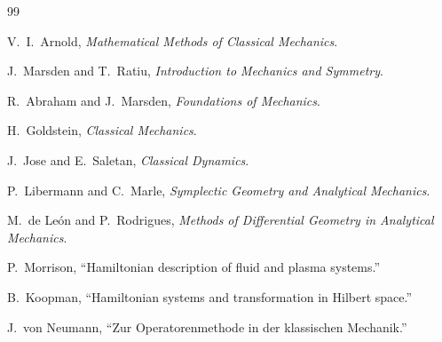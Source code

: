 \documentclass[11pt]{book}
\begin{document}
\begin{thebibliography}{99}

V.~I.~Arnold,
\textit{Mathematical Methods of Classical Mechanics}.

J.~Marsden and T.~Ratiu,
\textit{Introduction to Mechanics and Symmetry}.

R.~Abraham and J.~Marsden,
\textit{Foundations of Mechanics}.

H.~Goldstein,
\textit{Classical Mechanics}.

J.~Jose and E.~Saletan,
\textit{Classical Dynamics}.

P.~Libermann and C.~Marle,
\textit{Symplectic Geometry and Analytical Mechanics}.

M.~de Le\'on and P.~Rodrigues,
\textit{Methods of Differential Geometry in Analytical Mechanics}.

P.~Morrison,
``Hamiltonian description of fluid and plasma systems.''

B.~Koopman,
``Hamiltonian systems and transformation in Hilbert space.''

J.~von Neumann,
``Zur Operatorenmethode in der klassischen Mechanik.''

\end{thebibliography}
\end{document}
